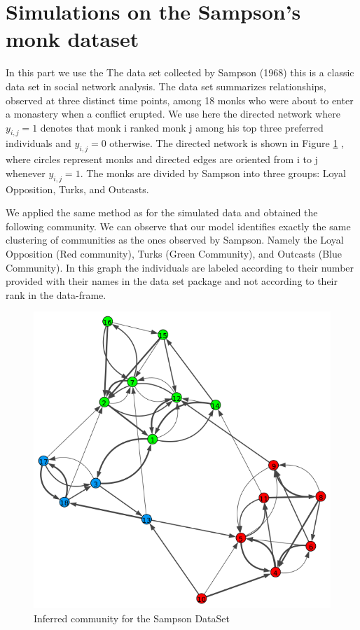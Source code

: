 \documentclass[12pt]{ociamthesis}  %
\begin{document}
	\section{Simulations on the Sampson’s monk dataset}
	In this part we use the The data set collected by Sampson (1968) this is a classic data set in social network analysis. The data set summarizes relationships, observed at three distinct time points, among 18 monks who were about to enter a monastery when a conflict erupted. We use here the directed network where $y_{i,j} = 1$ denotes that monk i ranked monk j among his top three preferred individuals and $y_{i,j} = 0$ otherwise. The directed network is shown in Figure \ref{label-image4} , where circles represent monks and directed edges are oriented from i to j whenever $y_{i,j} = 1$. The monks are divided by Sampson into three groups: Loyal Opposition, Turks, and Outcasts.
	
	We applied the same method as for the simulated data and obtained the following community. We can observe that our model identifies exactly the same clustering of communities as the ones observed by Sampson. Namely the Loyal Opposition (Red community), Turks (Green Community), and Outcasts (Blue Community). In this graph the individuals are labeled according to their number provided with their names in the data set package and not according to their rank in the data-frame.
	
	
	\begin{figure}
		\centering
		\includegraphics[width=\textwidth,height=\textheight,keepaspectratio]{OptimizationPlotSam}
		\caption{Inferred community for the Sampson DataSet}
		\label{label-image4}
	\end{figure}
	
	
	
\end{document}
